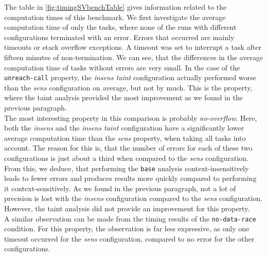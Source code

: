      The table in \autoref{fig:timingSVbenchTable} gives information related to the computation times of this benchmark. We first investigate the average computation time of only the tasks, where none of the runs with different configurations terminated with an error. Errors that occurred are mainly timeouts or stack overflow exceptions. A timeout was set to interrupt a task after fifteen minutes of non-termination. We can see, that the differences in the average computation time of tasks without errors are very small. In the case of the \texttt{unreach-call} property, the \textit{insens taint} configuration actually performed worse than the \textit{sens} configuration on average, but not by much. This is the property, where the taint analysis provided the most improvement as we found in the previous paragraph.\\
      The most interesting property in this comparison is probably \textit{no-overflow}. Here, both the \textit{insens} and the \textit{insens taint} configuration have a significantly lower average computation time than the \textit{sens} property, when taking all tasks into account. The reason for this is, that the number of errors for each of these two configurations is just about a third when compared to the \textit{sens} configuration. From this, we deduce, that performing the \texttt{base} analysis context-insensitively leads to fewer errors and produces results more quickly compared to performing it context-sensitively. As we found in the previous paragraph, not a lot of precision is lost with the \textit{insens} configuration compared to the \textit{sens} configuration. However, the taint analysis did not provide an improvement for this property.\\
      A similar observation can be made from the timing results of the \texttt{no-data-race} condition.  For this property, the observation is far less expressive, as only one timeout occurred for the \textit{sens} configuration, compared to no error for the other configurations.
    
